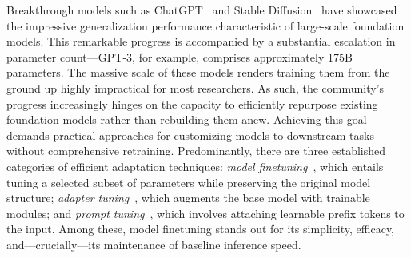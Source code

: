 Breakthrough models such as ChatGPT~\cite{brown2020language,chen2021evaluating} and Stable Diffusion~\cite{rombach2022high} have showcased the impressive generalization performance characteristic of large-scale foundation models. This remarkable progress is accompanied by a substantial escalation in parameter count—GPT-3, for example, comprises approximately 175B parameters. The massive scale of these models renders training them from the ground up highly impractical for most researchers. As such, the community’s progress increasingly hinges on the capacity to efficiently repurpose existing foundation models rather than rebuilding them anew. Achieving this goal demands practical approaches for customizing models to downstream tasks without comprehensive retraining. Predominantly, there are three established categories of efficient adaptation techniques: \emph{model finetuning}~\cite{hulora2022,zaken2022bitfit,guo2020parameter,raffel2020exploring,qiu2023controlling,zhang2022adaptive,chavan2023one}, which entails tuning a selected subset of parameters while preserving the original model structure; \emph{adapter tuning}~\cite{rebuffi2017learning,houlsby2019parameter,pfeiffer2020adapterfusion,lin2020exploring,he2021towards}, which augments the base model with trainable modules; and \emph{prompt tuning}~\cite{li2021prefix,lester2021power}, which involves attaching learnable prefix tokens to the input. Among these, model finetuning stands out for its simplicity, efficacy, and—crucially—its maintenance of baseline inference speed.

